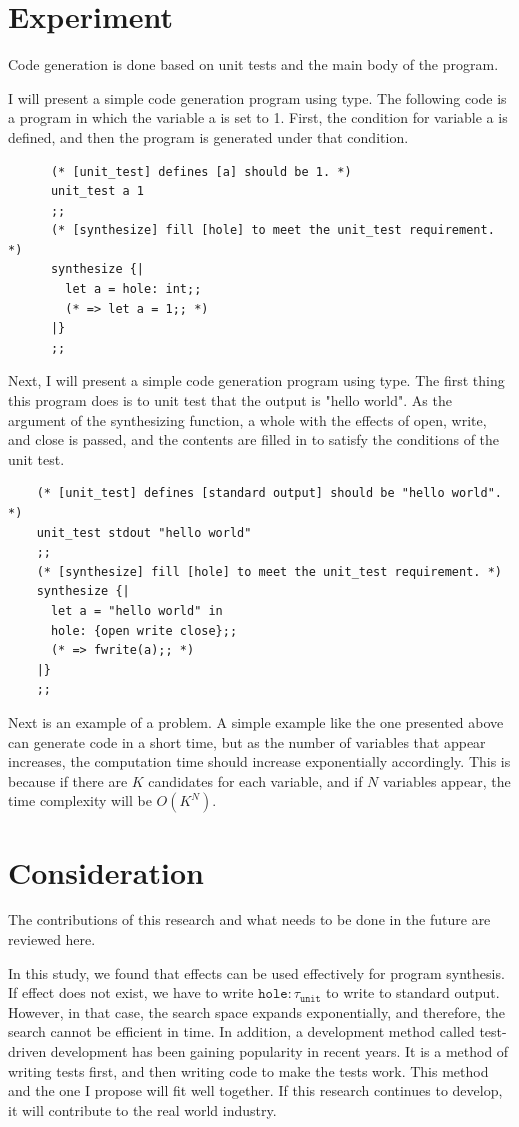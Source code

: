 \documentclass[12pt, a4paper, titlepage]{report}
\begin{document}
  \section{Experiment}\label{section:experiment}
  Code generation is done based on unit tests and the main body of the program.

  I will present a simple code generation program using type.
  The following code is a program in which the variable a is set to 1.
  First, the condition for variable a is defined, and then the program is generated under that condition.
  \begin{verbatim}
      (* [unit_test] defines [a] should be 1. *)
      unit_test a 1
      ;;
      (* [synthesize] fill [hole] to meet the unit_test requirement. *)
      synthesize {|
        let a = hole: int;;
        (* => let a = 1;; *)
      |}
      ;;
    \end{verbatim}

  Next, I will present a simple code generation program using type.
  The first thing this program does is to unit test that the output is "hello world".
  As the argument of the synthesizing function, a whole with the effects of open, write, and close is passed, and the contents are filled in to satisfy the conditions of the unit test.
  \begin{verbatim}
    (* [unit_test] defines [standard output] should be "hello world". *)
    unit_test stdout "hello world"
    ;;
    (* [synthesize] fill [hole] to meet the unit_test requirement. *)
    synthesize {|
      let a = "hello world" in
      hole: {open write close};;
      (* => fwrite(a);; *)
    |}
    ;;
  \end{verbatim}

  Next is an example of a problem.
  A simple example like the one presented above can generate code in a short time, but as the number of variables that appear increases, the computation time should increase exponentially accordingly.
  This is because if there are $K$ candidates for each variable, and if $N$ variables appear, the time complexity will be $O(K^N)$.

  \section{Consideration}
  The contributions of this research and what needs to be done in the future are reviewed here.

  In this study, we found that effects can be used effectively for program synthesis.
  If effect does not exist, we have to write $\mathtt{hole : \tau_{unit}}$ to write to standard output.
  However, in that case, the search space expands exponentially, and therefore, the search cannot be efficient in time.
  In addition, a development method called test-driven development has been gaining popularity in recent years.
  It is a method of writing tests first, and then writing code to make the tests work.
  This method and the one I propose will fit well together.
  If this research continues to develop, it will contribute to the real world industry.
\end{document}
